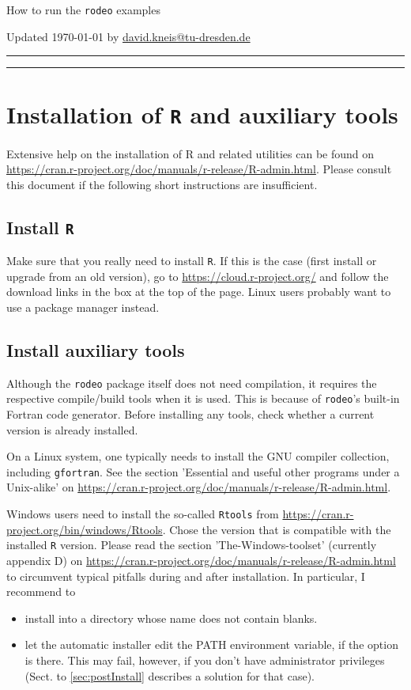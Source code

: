 \documentclass[10pt,a4paper]{article}
\author{dkneis}
\begin{document}
\newcommand{\software}[1]{\texttt{#1}}
\newcommand{\radmin}{\url{https://cran.r-project.org/doc/manuals/r-release/R-admin.html}}


{\LARGE How to run the \software{rodeo} examples}

\vspace{5mm}
Updated \today{} by \url{david.kneis@tu-dresden.de}

\vspace{5mm}
\hrule

\tableofcontents

\vspace{5mm}
\hrule

\section{Installation of \software{R} and auxiliary tools} \label{sec:install}

Extensive help on the installation of R and related utilities can be found on \radmin. Please consult this document if the following short instructions are insufficient.

\subsection{Install \software{R}}
Make sure that you really need to install \software{R}. If this is the case (first install or upgrade from an old version), go to \url{https://cloud.r-project.org/} and follow the download links in the box at the top of the page. Linux users probably want to use a package manager instead.

\subsection{Install auxiliary tools}
Although the \software{rodeo} package itself does not need compilation, it requires the respective compile/build tools when it is used. This is because of \software{rodeo}'s built-in Fortran code generator. Before installing any tools, check whether a current version is already installed.

On a Linux system, one typically needs to install the GNU compiler collection, including \software{gfortran}. See the section 'Essential and useful other programs under a Unix-alike' on \radmin.

Windows users need to install the so-called \software{Rtools} from \url{https://cran.r-project.org/bin/windows/Rtools}. Chose the version that is compatible with the installed \software{R} version. Please read the section 'The-Windows-toolset' (currently appendix D) on \radmin{} to circumvent typical pitfalls during and after installation. In particular, I recommend to
\begin{itemize}
  \item install into a directory whose name does not contain blanks.
  \item let the automatic installer edit the PATH environment variable, if the option is there. This may fail, however, if you don't have administrator privileges (Sect. to \ref{sec:postInstall} describes a solution for that case).
\end{itemize}
\end{document}

